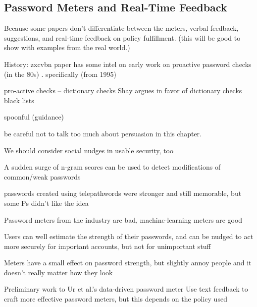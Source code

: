 	
	\subsection{Password Meters and Real-Time Feedback}
	
	 Because some papers don't differentiate between the meters, verbal feedback, suggestions, and real-time feedback on policy fulfillment. (this will be good to show with examples from the real world.)
	
	
	
	History: zxcvbn paper has some intel on early work on proactive password checks (in the 80s) \cite{Wheeler2016zxcvbn}. specifically (from 1995) \cite{Bishop1995ProactivePasswordChecking}
	
	
	pro-active checks -- dictionary checks Shay argues in favor of dictionary checks \cite{Shay2014CanLongPasswordsBeSecureAndUsable} 
	black lists \cite{Habib2017Blacklists} 
	
	spoonful (guidance) \cite{Shay2015SpoonfulOfSugar}
	\cite{Forget2008ImprovingPasswordsThroughPersuasion}
	
	be careful not to talk too much about persuasion in this chapter. 
	
	We should consider social nudges in usable security, too \cite{DiGioia2005SocialNavigationUsableSecurity}
	
	
	A sudden surge of n-gram scores can be used to detect modifications of common/weak passwords \cite{Tupsamudre2016MarkovStrength}
	
	
	passwords created using telepathwords were stronger and still memorable, but some Ps didn't like the idea \cite{Komanduri2014Telepathwords}
	
	Password meters from the industry are bad, machine-learning meters are good \cite{Wang2016fuzzyPWM}
	
	Users can well estimate the strength of their passwords, and can be nudged to act more securely for important accounts, but not for unimportant stuff \cite{Egelman2013DoesMyPasswordGoUpToEleven}
	
	Meters have a small effect on password strength, but slightly annoy people and it doesn't really matter how they look \cite{Ur2012HowDoesYourPasswordMeasureUp}
	
	Preliminary work to Ur et al.'s data-driven password meter \cite{Eargle2015YouCanDoBetter}
	Use text feedback to craft more effective password meters, but this depends on the policy used \cite{Ur2017DataDrivenPWMeter}
	
